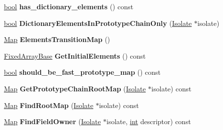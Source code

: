 \begin{DoxyCompactItemize}
\item 
\mbox{\label{classv8_1_1internal_1_1Map_a5bb4abfe3daca3cb23dd57b954583f1e}} 
\mbox{\hyperlink{classbool}{bool}} {\bfseries has\+\_\+dictionary\+\_\+elements} () const
\item 
\mbox{\label{classv8_1_1internal_1_1Map_a7d180c76f7f3c9ab09e88b2715de5438}} 
\mbox{\hyperlink{classbool}{bool}} {\bfseries Dictionary\+Elements\+In\+Prototype\+Chain\+Only} (\mbox{\hyperlink{classv8_1_1internal_1_1Isolate}{Isolate}} $\ast$isolate)
\item 
\mbox{\label{classv8_1_1internal_1_1Map_ab15e45ad23170de2141ed2782a6a9933}} 
\mbox{\hyperlink{classv8_1_1internal_1_1Map}{Map}} {\bfseries Elements\+Transition\+Map} ()
\item 
\mbox{\label{classv8_1_1internal_1_1Map_a704d2d726cd65522d28187674bb68758}} 
\mbox{\hyperlink{classv8_1_1internal_1_1FixedArrayBase}{Fixed\+Array\+Base}} {\bfseries Get\+Initial\+Elements} () const
\item 
\mbox{\label{classv8_1_1internal_1_1Map_a40a306471e0d05723c86ab1373180810}} 
\mbox{\hyperlink{classbool}{bool}} {\bfseries should\+\_\+be\+\_\+fast\+\_\+prototype\+\_\+map} () const
\item 
\mbox{\label{classv8_1_1internal_1_1Map_a02a67b25c8787544fb6298242e34c54a}} 
\mbox{\hyperlink{classv8_1_1internal_1_1Map}{Map}} {\bfseries Get\+Prototype\+Chain\+Root\+Map} (\mbox{\hyperlink{classv8_1_1internal_1_1Isolate}{Isolate}} $\ast$isolate) const
\item 
\mbox{\label{classv8_1_1internal_1_1Map_a8057f284693db10e1c664b58674536c6}} 
\mbox{\hyperlink{classv8_1_1internal_1_1Map}{Map}} {\bfseries Find\+Root\+Map} (\mbox{\hyperlink{classv8_1_1internal_1_1Isolate}{Isolate}} $\ast$isolate) const
\item 
\mbox{\label{classv8_1_1internal_1_1Map_aa1ab7905c9f4d215c000709f2d548583}} 
\mbox{\hyperlink{classv8_1_1internal_1_1Map}{Map}} {\bfseries Find\+Field\+Owner} (\mbox{\hyperlink{classv8_1_1internal_1_1Isolate}{Isolate}} $\ast$isolate, \mbox{\hyperlink{classint}{int}} descriptor) const

\end{DoxyCompactItemize}

